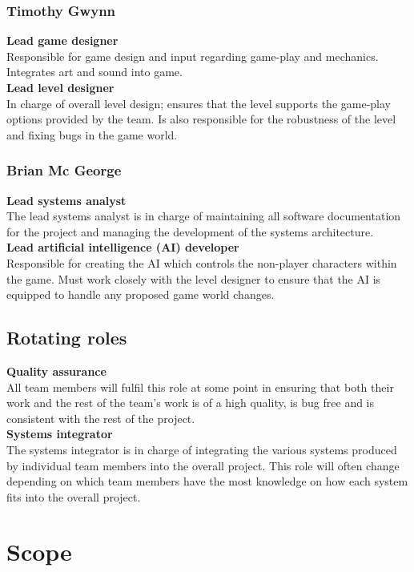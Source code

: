 \documentclass[a4paper,10pt]{article}
\begin{document}
		\subsubsection{Timothy Gwynn}
		\textbf{Lead game designer}\\
		Responsible for game design and input regarding game-play and mechanics. Integrates art and sound into game.
		\smallskip\\
		\textbf{Lead level designer}\\
		In charge of overall level design; ensures that the level supports the game-play options provided by the team. Is also responsible for the robustness of the level and fixing bugs in the game world.

		\subsubsection{Brian Mc George}
		\textbf{Lead systems analyst}\\
		The lead systems analyst is in charge of maintaining all software documentation for the project and managing the development of the systems architecture.
		\smallskip\\
		\textbf{Lead artificial intelligence (AI) developer}\\
		Responsible for creating the AI which controls the non-player characters within the game. Must work closely with the level designer to ensure that the AI is equipped to handle any proposed game world changes.

		\subsection{Rotating roles}
		\textbf{Quality assurance}\\
		All team members will fulfil this role at some point in ensuring that both their work and the rest of the team's work is of a high quality, is bug free and is consistent with the rest of the project.
		\smallskip\\
		\textbf{Systems integrator}\\
		The systems integrator is in charge of integrating the various systems produced by individual team members into the overall project. This role will often change depending on which team members have the most knowledge on how each system fits into the overall project.

		\section{Scope}
\end{document}
